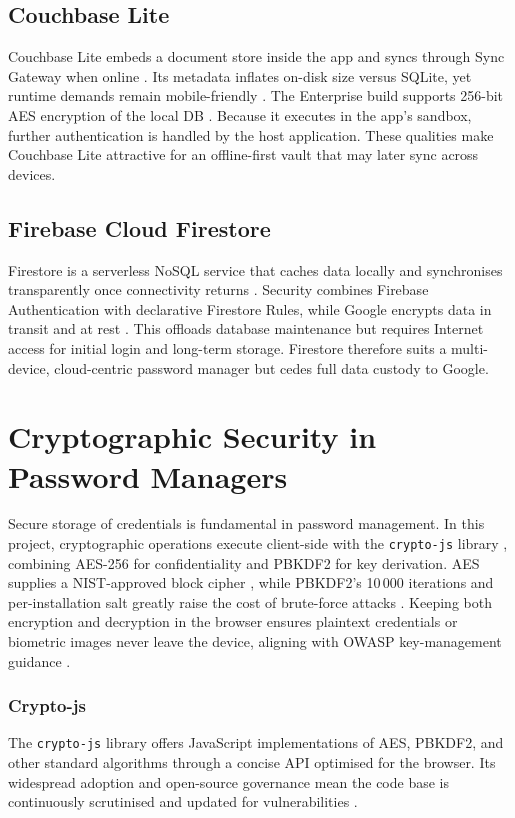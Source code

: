 \subsection*{Couchbase Lite}
Couchbase Lite embeds a document store inside the app and syncs through
Sync Gateway when online \autocite{Pal2016}.  Its metadata inflates on-disk
size versus SQLite, yet runtime demands remain mobile-friendly
\autocite{Gkamas2022}.  The Enterprise build supports 256-bit AES encryption
of the local DB \autocite{CouchbaseEncryption, CouchbaseDoc2025}.  Because it
executes in the app's sandbox, further authentication is handled by the host
application.  These qualities make Couchbase Lite attractive for an
offline-first vault that may later sync across devices.

\subsection*{Firebase Cloud Firestore}
Firestore is a serverless NoSQL service that caches data locally and
synchronises transparently once connectivity returns \autocite{FirebaseDoc2025}.
Security combines Firebase Authentication with declarative Firestore Rules,
while Google encrypts data in transit and at rest \autocite{FirebaseSecurity2025}.
This offloads database maintenance but requires Internet access for initial
login and long-term storage.  Firestore therefore suits a multi-device,
cloud-centric password manager but {\selectfont cedes full data custody to Google}.

\clearpage

\section{Cryptographic Security in Password Managers}
\label{sec:crypto}
Secure storage of credentials is fundamental in password management.
In this project, cryptographic operations execute client-side with the
\texttt{crypto-js} library \autocite{CryptoJS2024}, combining AES-256 for
confidentiality and PBKDF2 for key derivation.  AES supplies a
NIST-approved block cipher \autocite{NISTFIPS197}, while PBKDF2's 10\,000
iterations and per-installation salt greatly raise the cost of brute-force
attacks \autocite{RFC8018}.  Keeping both encryption and decryption in the
browser ensures plaintext credentials or biometric images never leave the
device, aligning with OWASP key-management guidance
\textcite{OWASPKeyMgmt2025}.

\subsubsection{Crypto-js}  
The \texttt{crypto-js} library offers JavaScript implementations of AES,
PBKDF2, and other standard algorithms through a concise API optimised for the
browser.  Its widespread adoption and open-source governance mean the code
base is continuously scrutinised and updated for vulnerabilities
\autocite{CryptoJS2024}.

